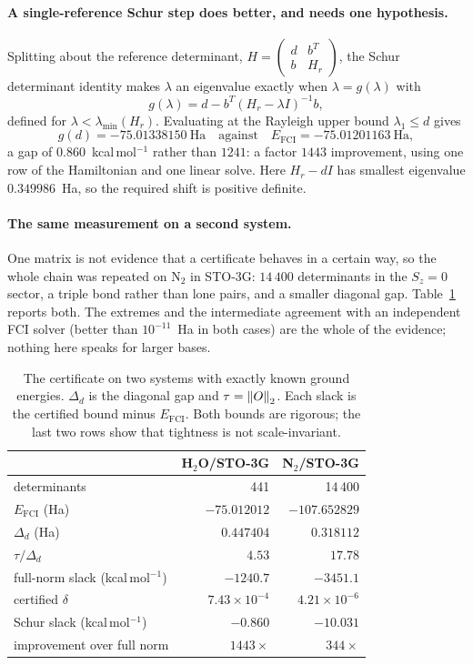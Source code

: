 \paragraph{A single-reference Schur step does better, and needs one hypothesis.}
Splitting about the reference determinant, $H = \begin{pmatrix} d & b^T\\
b & H_r\end{pmatrix}$, the Schur determinant identity makes $\lambda$ an
eigenvalue exactly when $\lambda = g(\lambda)$ with
\[
  g(\lambda) = d - b^T (H_r-\lambda I)^{-1} b ,
\]
defined for $\lambda<\lambda_{\min}(H_r)$. Evaluating at the Rayleigh upper bound
$\lambda_1\le d$ gives
\[
  g(d) = -75.01338150\ \text{Ha}
  \quad\text{against}\quad
  E_{\mathrm{FCI}} = -75.01201163\ \text{Ha},
\]
a gap of $0.860$~kcal\,mol$^{-1}$ rather than $1241$: a factor $1443$ improvement,
using one row of the Hamiltonian and one linear solve. Here
$H_r-dI$ has smallest eigenvalue $0.349986$~Ha, so the required shift is positive
definite.

\paragraph{The same measurement on a second system.}
One matrix is not evidence that a certificate behaves in a certain way, so the
whole chain was repeated on N$_2$ in STO-3G: $14\,400$ determinants in the
$S_z=0$ sector, a triple bond rather than lone pairs, and a smaller diagonal gap.
Table~\ref{tab:two-systems} reports both. The extremes and the intermediate
agreement with an independent FCI solver (better than $10^{-11}$~Ha in both
cases) are the whole of the evidence; nothing here speaks for larger bases.

\begin{table}[t]
\centering
\caption{The certificate on two systems with exactly known ground energies.
$\Delta_d$ is the diagonal gap and $\tau=\left\lVert O\right\rVert_2$. Each slack is the certified
bound minus $E_{\mathrm{FCI}}$. Both bounds are rigorous; the last two rows show
that tightness is not scale-invariant.}
\label{tab:two-systems}
\begin{tabular}{lrr}
\hline
 & H$_2$O/STO-3G & N$_2$/STO-3G\\
\hline
determinants               & 441      & 14\,400\\
$E_{\mathrm{FCI}}$ (Ha)    & $-75.012012$ & $-107.652829$\\
$\Delta_d$ (Ha)            & $0.447404$ & $0.318112$\\
$\tau/\Delta_d$            & $4.53$   & $17.78$\\
full-norm slack (kcal\,mol$^{-1}$) & $-1240.7$ & $-3451.1$\\
certified $\delta$         & $7.43\times10^{-4}$ & $4.21\times10^{-6}$\\
Schur slack (kcal\,mol$^{-1}$) & $-0.860$ & $-10.031$\\
improvement over full norm & $1443\times$ & $344\times$\\
\hline
\end{tabular}
\end{table}

